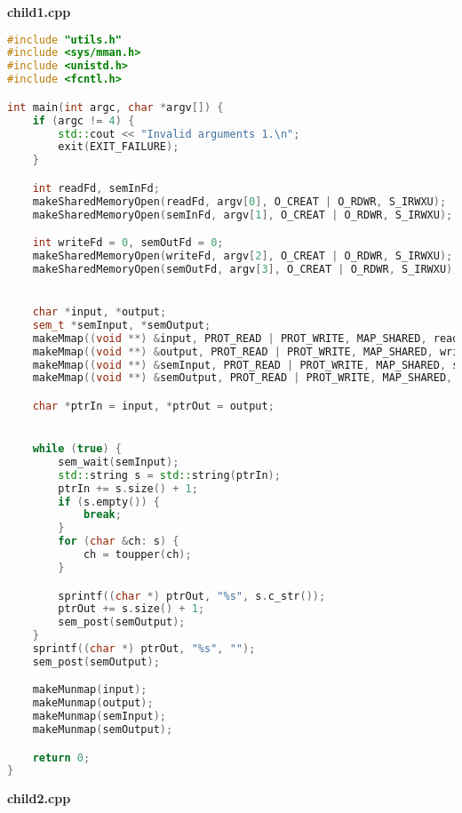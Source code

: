 \documentclass[pdf, unicode, 12pt, a4paper,oneside,fleqn]{article}
\begin{document}
{\large\textbf{child1.cpp}}

\begin{lstlisting}[language=C++]
#include "utils.h"
#include <sys/mman.h>
#include <unistd.h>
#include <fcntl.h>

int main(int argc, char *argv[]) {
    if (argc != 4) {
        std::cout << "Invalid arguments 1.\n";
        exit(EXIT_FAILURE);
    }

    int readFd, semInFd;
    makeSharedMemoryOpen(readFd, argv[0], O_CREAT | O_RDWR, S_IRWXU);
    makeSharedMemoryOpen(semInFd, argv[1], O_CREAT | O_RDWR, S_IRWXU);

    int writeFd = 0, semOutFd = 0;
    makeSharedMemoryOpen(writeFd, argv[2], O_CREAT | O_RDWR, S_IRWXU);
    makeSharedMemoryOpen(semOutFd, argv[3], O_CREAT | O_RDWR, S_IRWXU);


    char *input, *output;
    sem_t *semInput, *semOutput;
    makeMmap((void **) &input, PROT_READ | PROT_WRITE, MAP_SHARED, readFd);
    makeMmap((void **) &output, PROT_READ | PROT_WRITE, MAP_SHARED, writeFd);
    makeMmap((void **) &semInput, PROT_READ | PROT_WRITE, MAP_SHARED, semInFd);
    makeMmap((void **) &semOutput, PROT_READ | PROT_WRITE, MAP_SHARED, semOutFd);

    char *ptrIn = input, *ptrOut = output;


    while (true) {
        sem_wait(semInput);
        std::string s = std::string(ptrIn);
        ptrIn += s.size() + 1;
        if (s.empty()) {
            break;
        }
        for (char &ch: s) {
            ch = toupper(ch);
        }

        sprintf((char *) ptrOut, "%s", s.c_str());
        ptrOut += s.size() + 1;
        sem_post(semOutput);
    }
    sprintf((char *) ptrOut, "%s", "");
    sem_post(semOutput);

    makeMunmap(input);
    makeMunmap(output);
    makeMunmap(semInput);
    makeMunmap(semOutput);

    return 0;
}
\end{lstlisting}

{\large\textbf{child2.cpp}}
\end{document}
